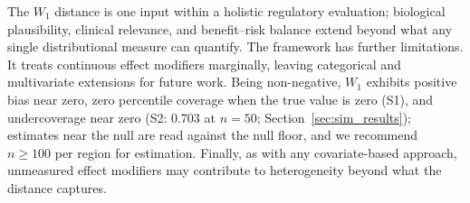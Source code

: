 \documentclass[AMA,Times1COL]{WileyNJDv5}
\begin{document}
The $W_1$ distance is one input within a holistic regulatory evaluation; biological plausibility, clinical relevance, and benefit--risk balance extend beyond what any single distributional measure can quantify.\cite{iche17,matsushima2024} The framework has further limitations. It treats continuous effect modifiers marginally, leaving categorical and multivariate extensions for future work. Being non-negative, $W_1$ exhibits positive bias near zero, zero percentile coverage when the true value is zero (S1), and undercoverage near zero (S2: 0.703 at $n = 50$; Section~\ref{sec:sim_results});\cite{andrews2000} estimates near the null are read against the null floor, and we recommend $n \geq 100$ per region for estimation. Finally, as with any covariate-based approach, unmeasured effect modifiers may contribute to heterogeneity beyond what the distance captures.
\end{document}

